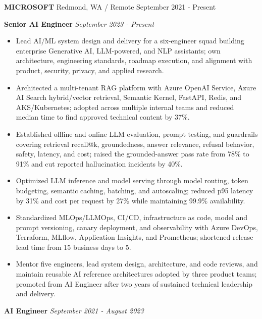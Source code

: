 \documentclass[10pt]{article}
\providecommand{\tightlist}{%
  \setlength{\itemsep}{0pt}\setlength{\parskip}{0pt}}
\begin{document}
\textbf{MICROSOFT} \textbar{} Redmond, WA / Remote \textbar{} September
2021 - Present

\textbf{Senior AI Engineer} \textbar{} \emph{September 2023 - Present}

\begin{itemize}
\tightlist
\item
  Lead AI/ML system design and delivery for a six-engineer squad
  building enterprise Generative AI, LLM-powered, and NLP assistants;
  own architecture, engineering standards, roadmap execution, and
  alignment with product, security, privacy, and applied research.
\item
  Architected a multi-tenant RAG platform with Azure OpenAI Service,
  Azure AI Search hybrid/vector retrieval, Semantic Kernel, FastAPI,
  Redis, and AKS/Kubernetes; adopted across multiple internal teams and
  reduced median time to find approved technical content by 37\%.
\item
  Established offline and online LLM evaluation, prompt testing, and
  guardrails covering retrieval recall@k, groundedness, answer
  relevance, refusal behavior, safety, latency, and cost; raised the
  grounded-answer pass rate from 78\% to 91\% and cut reported
  hallucination incidents by 40\%.
\item
  Optimized LLM inference and model serving through model routing, token
  budgeting, semantic caching, batching, and autoscaling; reduced p95
  latency by 31\% and cost per request by 27\% while maintaining 99.9\%
  availability.
\item
  Standardized MLOps/LLMOps, CI/CD, infrastructure as code, model and
  prompt versioning, canary deployment, and observability with Azure
  DevOps, Terraform, MLflow, Application Insights, and Prometheus;
  shortened release lead time from 15 business days to 5.
\item
  Mentor five engineers, lead system design, architecture, and code
  reviews, and maintain reusable AI reference architectures adopted by
  three product teams; promoted from AI Engineer after two years of
  sustained technical leadership and delivery.
\end{itemize}

\textbf{AI Engineer} \textbar{} \emph{September 2021 - August 2023}
\end{document}

